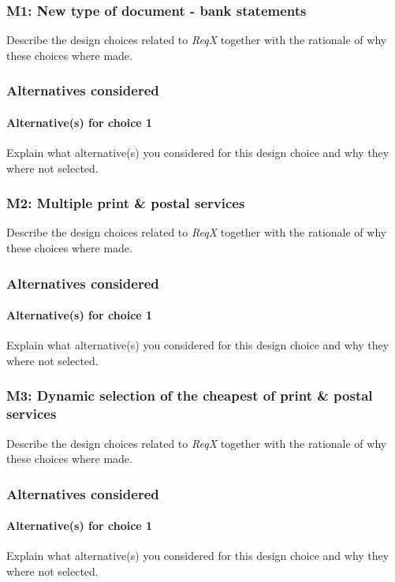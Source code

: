 \subsubsection{M1: New type of document - bank statements}
Describe the design choices related to \emph{ReqX} together with the rationale
of why these choices where made.

\subsubsection*{Alternatives considered}
\paragraph{Alternative(s) for choice 1} Explain what alternative(s) you
considered for this design choice and why they where not selected.

\subsubsection{M2: Multiple print \& postal services}
Describe the design choices related to \emph{ReqX} together with the rationale
of why these choices where made.

\subsubsection*{Alternatives considered}
\paragraph{Alternative(s) for choice 1} Explain what alternative(s) you
considered for this design choice and why they where not selected.

\subsubsection{M3: Dynamic selection of the cheapest of print \& postal services}
Describe the design choices related to \emph{ReqX} together with the rationale
of why these choices where made.

\subsubsection*{Alternatives considered}
\paragraph{Alternative(s) for choice 1} Explain what alternative(s) you
considered for this design choice and why they where not selected.
